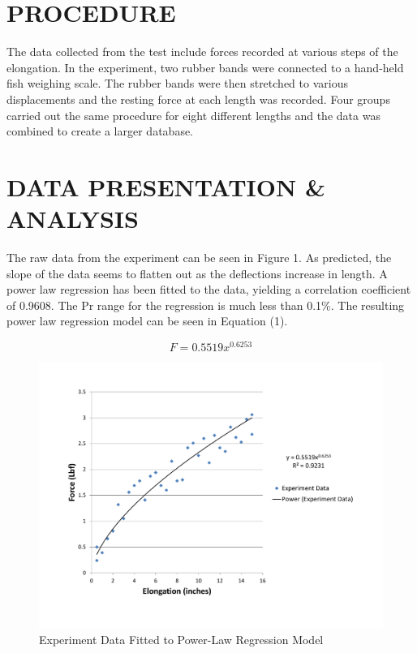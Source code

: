 \documentclass[12pt]{article}
\begin{document}
\section*{\fontsize{12}{12}\selectfont PROCEDURE}
The data collected from the test include forces recorded at various steps of the elongation. In the experiment, two rubber bands were connected to a hand-held fish weighing scale. The rubber bands were then stretched to various displacements and the resting force at each length was recorded. Four groups carried out the same procedure for eight different lengths and the data was combined to create a larger database.


\section*{\fontsize{12}{12}\selectfont DATA PRESENTATION \& ANALYSIS}
The raw data from the experiment can be seen in Figure 1. As predicted, the slope of the data seems to flatten out as the deflections increase in length. A power law regression has been fitted to the data, yielding a correlation coefficient of 0.9608. The Pr range for the regression is much less than 0.1\%. The resulting power law regression model can be seen in Equation (1). 
\bigskip

\begin{equation}
F = 0.5519x^{0.6253}
\end{equation}

\begin{figure}[t!] %
   \centering
   \includegraphics[width=\linewidth]{power_regression.pdf} 
   \caption{Experiment Data Fitted to Power-Law Regression Model}
   \label{fig:example}
\end{figure}
\end{document}
